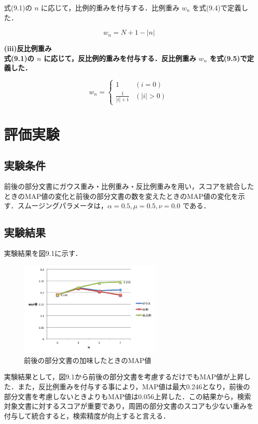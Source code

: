 式(9.1)の $n$ に応じて，比例的重みを付与する．比例重み $w_n$ を式(9.4)で定義した．

\begin{equation}
    w_n = N+1-|n|
    \label{zengo4}
\end{equation}

\bf(iii)反比例重み \\

式(9.1)の $n$ に応じて，反比例的重みを付与する．反比例重み $w_n$ を式(9.5)で定義した．

\begin{equation}
    w_n = 
    \begin{cases} 
        1 & (i = 0)\\ 
        \frac{1}{|i|+1} & (|i| > 0)
    \end{cases} 
    \label{zengo5}
\end{equation}

\section{評価実験}
\subsection{実験条件}
前後の部分文書にガウス重み・比例重み・反比例重みを用い，スコアを統合したときのMAP値の変化と前後の部分文書の数を変えたときのMAP値の変化を示す．スムージングパラメータは，$\alpha= 0.5, \mu= 0.5, \nu= 0.0$ である．

\subsection{実験結果}
実験結果を図9.1に示す．

\begin{figure}
    \centering
    \includegraphics[width=7cm]{./image/zengo.png}
    \caption{前後の部分文書の加味したときのMAP値}
    \label{web_result1}
\end{figure}

実験結果として，図9.1から前後の部分文書を考慮するだけでもMAP値が上昇した．また，反比例重みを付与する事により，MAP値は最大0.246となり，前後の部分文書を考慮しないときよりもMAP値は0.056上昇した．この結果から，検索対象文書に対するスコアが重要であり，周囲の部分文書のスコアも少ない重みを付与して統合すると，検索精度が向上すると言える．

